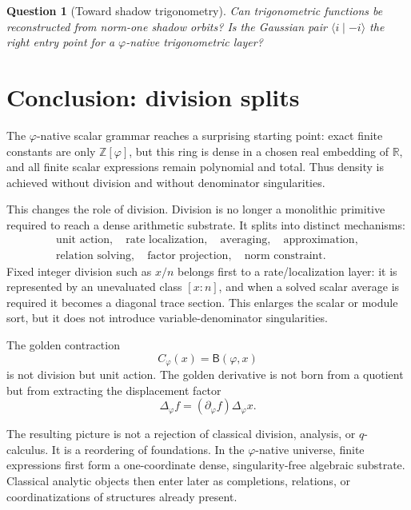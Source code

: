 \documentclass[11pt]{article}
\newtheorem{question}[definition]{Question}
\newcommand{\B}{\mathsf{B}}
\newcommand{\ph}{\varphi}
\newcommand{\Z}{\mathbb{Z}}
\newcommand{\R}{\mathbb{R}}
\begin{document}
\begin{question}[Toward shadow trigonometry]
Can trigonometric functions be reconstructed from norm-one shadow orbits?  Is the Gaussian pair $\langle i\mid -i\rangle$ the right entry point for a $\ph$-native trigonometric layer?
\end{question}

\section{Conclusion: division splits}

The $\ph$-native scalar grammar reaches a surprising starting point: exact finite constants are only $\Z[\ph]$, but this ring is dense in a chosen real embedding of $\R$, and all finite scalar expressions remain polynomial and total.  Thus density is achieved without division and without denominator singularities.

This changes the role of division.  Division is no longer a monolithic primitive required to reach a dense arithmetic substrate.  It splits into distinct mechanisms:
\[
\begin{gathered}
    \text{unit action},\quad \text{rate localization},\quad \text{averaging},\quad \text{approximation},\\
    \text{relation solving},\quad \text{factor projection},\quad \text{norm constraint}.
\end{gathered}
\]
Fixed integer division such as \(x/n\) belongs first to a rate/localization layer: it is represented by an unevaluated class \([x:n]\), and when a solved scalar average is required it becomes a diagonal trace section.  This enlarges the scalar or module sort, but it does not introduce variable-denominator singularities.

The golden contraction
\[
    C_\ph(x)=\B(\ph,x)
\]
is not division but unit action.  The golden derivative is not born from a quotient but from extracting the displacement factor
\[
    \Delta_\ph f=(\partial_\ph f)\Delta_\ph x.
\]

The resulting picture is not a rejection of classical division, analysis, or $q$-calculus.  It is a reordering of foundations.  In the $\ph$-native universe, finite expressions first form a one-coordinate dense, singularity-free algebraic substrate.  Classical analytic objects then enter later as completions, relations, or coordinatizations of structures already present.
\end{document}
